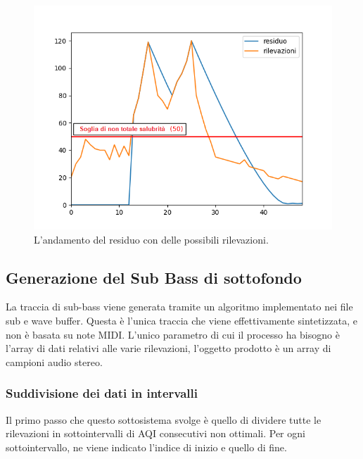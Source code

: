 \begin{figure}[h]
  \includegraphics[width=\linewidth]{img/residue.png}
  \caption{L'andamento del residuo con delle possibili rilevazioni.}
  \label{fig:residue}
\end{figure}








\subsection{Generazione del Sub Bass di sottofondo} 
La traccia di sub-bass viene generata tramite un algoritmo implementato nei file sub e wave buffer.
Questa è l'unica traccia che viene effettivamente sintetizzata, e non è basata su note MIDI.
L'unico parametro di cui il processo ha bisogno è l'array di dati relativi alle varie rilevazioni, l'oggetto prodotto è un array di campioni audio stereo.
\subsubsection{Suddivisione dei dati in intervalli}
Il primo passo che questo sottosistema svolge è quello di dividere tutte le rilevazioni in sottointervalli di AQI consecutivi non ottimali.
Per ogni sottointervallo, ne viene indicato l'indice di inizio e quello di fine.
